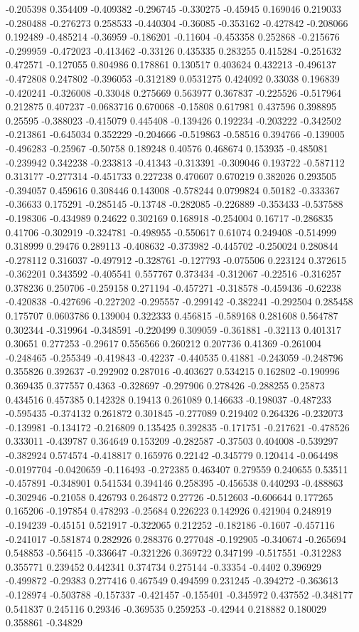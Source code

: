-0.205398 0.354409 -0.409382 -0.296745 -0.330275 -0.45945 0.169046 0.219033 -0.280488 -0.276273 0.258533 -0.440304 -0.36085 -0.353162 -0.427842 -0.208066 0.192489 -0.485214 -0.36959 -0.186201 -0.11604 -0.453358 0.252868 -0.215676 -0.299959 -0.472023 -0.413462 -0.33126 0.435335 0.283255 0.415284 -0.251632 0.472571 -0.127055 0.804986 0.178861 0.130517 0.403624 0.432213 -0.496137 -0.472808 0.247802 -0.396053 -0.312189 0.0531275 0.424092 0.33038 0.196839 -0.420241 -0.326008 -0.33048 0.275669 0.563977 0.367837 -0.225526 -0.517964 0.212875 0.407237 -0.0683716 0.670068 -0.15808 0.617981 0.437596 0.398895 0.25595 -0.388023 -0.415079 0.445408 -0.139426 0.192234 -0.203222 -0.342502 -0.213861 -0.645034 0.352229 -0.204666 -0.519863 -0.58516 0.394766 -0.139005 -0.496283 -0.25967 -0.50758 0.189248 0.40576 0.468674 0.153935 -0.485081 -0.239942 0.342238 -0.233813 -0.41343 -0.313391 -0.309046 0.193722 -0.587112 0.313177 -0.277314 -0.451733 0.227238 0.470607 0.670219 0.382026 0.293505 -0.394057 0.459616 0.308446 0.143008 -0.578244 0.0799824 0.50182 -0.333367 -0.36633 0.175291 -0.285145 -0.13748 -0.282085 -0.226889 -0.353433 -0.537588 -0.198306 -0.434989 0.24622 0.302169 0.168918 -0.254004 0.16717 -0.286835 0.41706 -0.302919 -0.324781 -0.498955 -0.550617 0.61074 0.249408 -0.514999 0.318999 0.29476 0.289113 -0.408632 -0.373982 -0.445702 -0.250024 0.280844 -0.278112 0.316037 -0.497912 -0.328761 -0.127793 -0.075506 0.223124 0.372615 -0.362201 0.343592 -0.405541 0.557767 0.373434 -0.312067 -0.22516 -0.316257 0.378236 0.250706 -0.259158 0.271194 -0.457271 -0.318578 -0.459436 -0.62238 -0.420838 -0.427696 -0.227202 -0.295557 -0.299142 -0.382241 -0.292504 0.285458 0.175707 0.0603786 0.139004 0.322333 0.456815 -0.589168 0.281608 0.564787 0.302344 -0.319964 -0.348591 -0.220499 0.309059 -0.361881 -0.32113 0.401317 0.30651 0.277253 -0.29617 0.556566 0.260212 0.207736 0.41369 -0.261004 -0.248465 -0.255349 -0.419843 -0.42237 -0.440535 0.41881 -0.243059 -0.248796 0.355826 0.392637 -0.292902 0.287016 -0.403627 0.534215 0.162802 -0.190996 0.369435 0.377557 0.4363 -0.328697 -0.297906 0.278426 -0.288255 0.25873 0.434516 0.457385 0.142328 0.19413 0.261089 0.146633 -0.198037 -0.487233 -0.595435 -0.374132 0.261872 0.301845 -0.277089 0.219402 0.264326 -0.232073 -0.139981 -0.134172 -0.216809 0.135425 0.392835 -0.171751 -0.217621 -0.478526 0.333011 -0.439787 0.364649 0.153209 -0.282587 -0.37503 0.404008 -0.539297 -0.382924 0.574574 -0.418817 0.165976 0.22142 -0.345779 0.120414 -0.064498 -0.0197704 -0.0420659 -0.116493 -0.272385 0.463407 0.279559 0.240655 0.53511 -0.457891 -0.348901 0.541534 0.394146 0.258395 -0.456538 0.440293 -0.488863 -0.302946 -0.21058 0.426793 0.264872 0.27726 -0.512603 -0.606644 0.177265 0.165206 -0.197854 0.478293 -0.25684 0.226223 0.142926 0.421904 0.248919 -0.194239 -0.45151 0.521917 -0.322065 0.212252 -0.182186 -0.1607 -0.457116 -0.241017 -0.581874 0.282926 0.288376 0.277048 -0.192905 -0.340674 -0.265694 0.548853 -0.56415 -0.336647 -0.321226 0.369722 0.347199 -0.517551 -0.312283 0.355771 0.239452 0.442341 0.374734 0.275144 -0.33354 -0.4402 0.396929 -0.499872 -0.29383 0.277416 0.467549 0.494599 0.231245 -0.394272 -0.363613 -0.128974 -0.503788 -0.157337 -0.421457 -0.155401 -0.345972 0.437552 -0.348177 0.541837 0.245116 0.29346 -0.369535 0.259253 -0.42944 0.218882 0.180029 0.358861 -0.34829 
